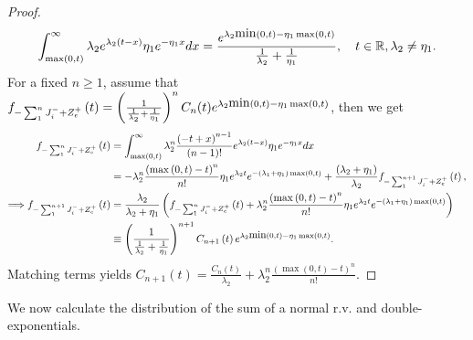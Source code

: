 \documentclass[11pt]{article}
\numberwithin{equation}{section}
\numberwithin{theorem}{section}
\def\R{\mathbb{R}}
\begin{document}
\begin{proof}
\begin{align*}
\int_{\max\left(0,t\right)}^{\infty}\lambda_{2}e^{\lambda_{2}\left(t-x\right)}\eta_{1}e^{-\eta_{1}x}dx 
 =\frac{e^{\lambda_{2}\hbox{min}\left(0,t\right)-\eta_{1}\max\left(0,t\right)}}{\frac{1}{\lambda_{2}}+\frac{1}{\eta_{1}}}, \quad t\in \R, \lambda_2 \neq \eta_1.
\end{align*}
For a fixed $n \ge 1$, assume that  $f_{-\sum_{1}^{n}J_{i}^{-}+Z_{e}^{+}}\left(t\right)=\left(\frac{1}{\frac{1}{\lambda_{2}}+\frac{1}{\eta_{1}}}\right)^{n}C_n(t) e^{\lambda_{2}\hbox{min}\left(0,t\right)-\eta_{1}\max\left(0,t\right)}$, then we get 
\begin{align*}
f_{-\sum_{1}^{n}J_{i}^{-}+Z_{e}^{+}}\left(t\right) & =\int_{\max\left(0,t\right)}^{\infty}\lambda_{2}^{n}\frac{\left(-t+x\right)^{n-1}}{\left(n-1\right)!}e^{\lambda_{2}\left(t-x\right)}\eta_{1}e^{-\eta_{1}x}dx\\
 & =-\lambda_{2}^{n}\frac{\left(\max\left(0,t\right)-t\right)^{n}}{n!}\eta_{1}e^{\lambda_{2}t}e^{-\left(\lambda_{1}+\eta_{1}\right)\max\left(0,t\right)}+\frac{\left(\lambda_{2}+\eta_{1}\right)}{\lambda_{2}}f_{-\sum_{1}^{n+1}J_{i}^{-}+Z_{e}^{+}}\left(t\right),\\
\Longrightarrow f_{-\sum_{1}^{n+1}J_{i}^{-}+Z_{e}^{+}}\left(t\right) & =\frac{\lambda_{2}}{\lambda_{2}+\eta_{1}}\left(f_{-\sum_{1}^{n}J_{i}^{-}+Z_{e}^{+}}\left(t\right)+\lambda_{2}^{n}\frac{\left(\max\left(0,t\right)-t\right)^{n}}{n!}\eta_{1}e^{\lambda_{2}t}e^{-\left(\lambda_{1}+\eta_{1}\right)\max\left(0,t\right)}\right)\\
 & \equiv\left(\frac{1}{\frac{1}{\lambda_{2}}+\frac{1}{\eta_{1}}}\right)^{n+1}C_{n+1}\left(t\right)e^{\lambda_{2}\hbox{min}\left(0,t\right)-\eta_{1}\max\left(0,t\right)}.
\end{align*}
Matching terms yields  $C_{n+1}\left(t\right)=\frac{C_{n}\left(t\right)}{\lambda_{2}}+\lambda_{2}^{n}\frac{\left(\max\left(0,t\right)-t\right)^{n}}{n!}.$ 
\end{proof}
We now calculate the distribution of the sum of a normal r.v. and   double-exponentials.  
\end{document}
